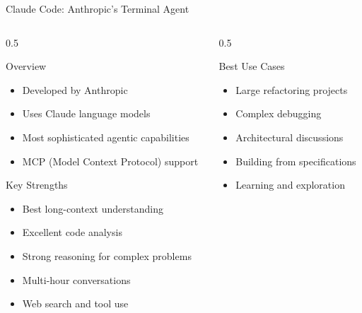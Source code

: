 \documentclass[aspectratio=169,11pt]{beamer}
\begin{document}
\begin{frame}{Claude Code: Anthropic's Terminal Agent}
    \begin{columns}[T]
        \begin{column}{0.5\textwidth}
            \begin{block}{Overview}
                \begin{itemize}
                    \item Developed by Anthropic
                    \item Uses Claude language models
                    \item Most sophisticated agentic capabilities
                    \item MCP (Model Context Protocol) support
                \end{itemize}
            \end{block}

            \begin{block}{Key Strengths}
                \begin{itemize}
                    \item Best long-context understanding
                    \item Excellent code analysis
                    \item Strong reasoning for complex problems
                    \item Multi-hour conversations
                    \item Web search and tool use
                \end{itemize}
            \end{block}
        \end{column}
        \begin{column}{0.5\textwidth}
            \begin{exampleblock}{Best Use Cases}
                \begin{itemize}
                    \item Large refactoring projects
                    \item Complex debugging
                    \item Architectural discussions
                    \item Building from specifications
                    \item Learning and exploration
                \end{itemize}
            \end{exampleblock}


\end{column}
\end{columns}
\end{frame}
\end{document}
